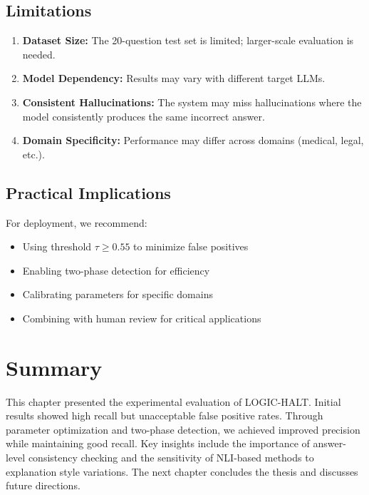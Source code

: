 \subsection{Limitations}

\begin{enumerate}
    \item \textbf{Dataset Size:} The 20-question test set is limited; larger-scale evaluation is needed.

    \item \textbf{Model Dependency:} Results may vary with different target LLMs.

    \item \textbf{Consistent Hallucinations:} The system may miss hallucinations where the model consistently produces the same incorrect answer.

    \item \textbf{Domain Specificity:} Performance may differ across domains (medical, legal, etc.).
\end{enumerate}

\subsection{Practical Implications}

For deployment, we recommend:
\begin{itemize}
    \item Using threshold $\tau \geq 0.55$ to minimize false positives
    \item Enabling two-phase detection for efficiency
    \item Calibrating parameters for specific domains
    \item Combining with human review for critical applications
\end{itemize}

\section{Summary}

This chapter presented the experimental evaluation of LOGIC-HALT. Initial results showed high recall but unacceptable false positive rates. Through parameter optimization and two-phase detection, we achieved improved precision while maintaining good recall. Key insights include the importance of answer-level consistency checking and the sensitivity of NLI-based methods to explanation style variations. The next chapter concludes the thesis and discusses future directions.

